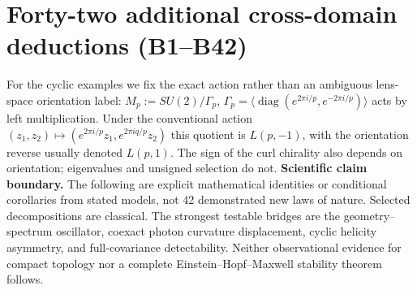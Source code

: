 \documentclass[aps,prd,onecolumn,notitlepage,groupedaddress,11pt]{revtex4-2}
\begin{document}
\section{Forty-two additional cross-domain deductions (B1--B42)}
\noindent For the cyclic examples we fix the exact action rather than an ambiguous lens-space orientation label: $M_p:=SU(2)/\Gamma_p$, $\Gamma_p=\langle\operatorname{diag}(e^{2\pi i/p},e^{-2\pi i/p})\rangle$ acts by left multiplication. Under the conventional action $(z_1,z_2)\mapsto(e^{2\pi i/p}z_1,e^{2\pi iq/p}z_2)$ this quotient is $L(p,-1)$, with the orientation reverse usually denoted $L(p,1)$. The sign of the curl chirality also depends on orientation; eigenvalues and unsigned selection do not.
\noindent\textbf{Scientific claim boundary.} The following are explicit mathematical identities or conditional corollaries from stated models, not 42 demonstrated new laws of nature. Selected decompositions are classical. The strongest testable bridges are the geometry--spectrum oscillator, coexact photon curvature displacement, cyclic helicity asymmetry, and full-covariance detectability. Neither observational evidence for compact topology nor a complete Einstein--Hopf--Maxwell stability theorem follows.
\end{document}
